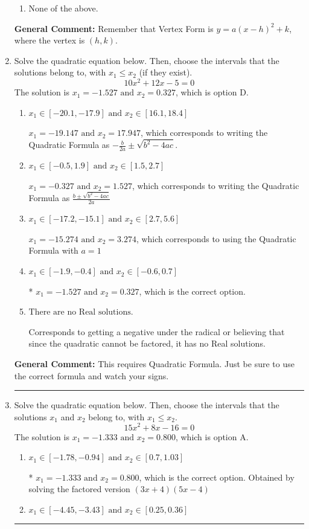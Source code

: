 \documentclass{extbook}[14pt]
\newcommand{\litem}[1]{\item #1

\rule{\textwidth}{0.4pt}}
\begin{document}
\begin{enumerate}
{\begin{enumerate}[label=\Alph*.]
\begin{multicols}{2}
\end{multicols}\item None of the above.\end{enumerate}
\textbf{General Comment:} Remember that Vertex Form is $y = a(x-h)^2+k$, where the vertex is $(h, k)$.
}
\litem{
Solve the quadratic equation below. Then, choose the intervals that the solutions belong to, with $x_1 \leq x_2$ (if they exist).
\[ 10x^{2} +12 x -5 = 0 \]The solution is \( x_1 = -1.527 \text{ and } x_2 = 0.327 \), which is option D.\begin{enumerate}[label=\Alph*.]
\item \( x_1 \in [-20.1, -17.9] \text{ and } x_2 \in [16.1, 18.4] \)

 $x_1 = -19.147 \text{ and } x_2 = 17.947$, which corresponds to writing the Quadratic Formula as $-\frac{b}{2a} \pm \sqrt{b^2 - 4ac}$.
\item \( x_1 \in [-0.5, 1.9] \text{ and } x_2 \in [1.5, 2.7] \)

 $x_1 = -0.327 \text{ and } x_2 = 1.527$, which corresponds to writing the Quadratic Formula as $\frac{b \pm \sqrt{b^2 - 4ac}}{2a}$
\item \( x_1 \in [-17.2, -15.1] \text{ and } x_2 \in [2.7, 5.6] \)

 $x_1 = -15.274 \text{ and } x_2 = 3.274$, which corresponds to using the Quadratic Formula with $a=1$
\item \( x_1 \in [-1.9, -0.4] \text{ and } x_2 \in [-0.6, 0.7] \)

* $x_1 = -1.527 \text{ and } x_2 = 0.327$, which is the correct option.
\item \( \text{There are no Real solutions.} \)

Corresponds to getting a negative under the radical or believing that since the quadratic cannot be factored, it has no Real solutions.
\end{enumerate}

\textbf{General Comment:} This requires Quadratic Formula. Just be sure to use the correct formula and watch your signs.
}
\litem{
Solve the quadratic equation below. Then, choose the intervals that the solutions $x_1$ and $x_2$ belong to, with $x_1 \leq x_2$.
\[ 15x^{2} +8 x -16 = 0 \]The solution is \( x_1 = -1.333 \text{ and } x_2 = 0.800 \), which is option A.\begin{enumerate}[label=\Alph*.]
\item \( x_1 \in [-1.78, -0.94] \text{ and } x_2 \in [0.7, 1.03] \)

* $x_1 = -1.333 \text{ and } x_2 = 0.800$, which is the correct option. Obtained by solving the factored version $(3x + 4)(5x -4)$
\item \( x_1 \in [-4.45, -3.43] \text{ and } x_2 \in [0.25, 0.36] \)


\end{enumerate}}
\end{enumerate}
\end{document}
